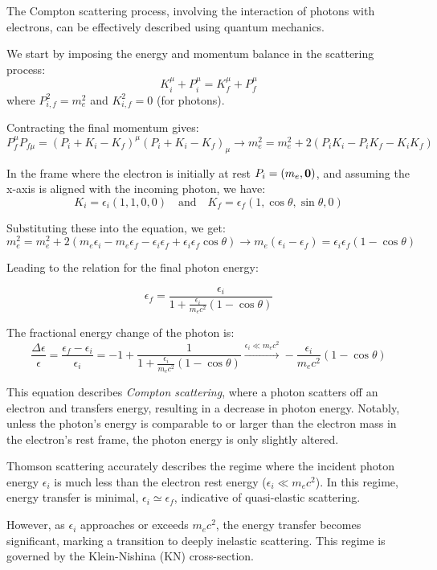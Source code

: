 The Compton scattering process, involving the interaction of photons with electrons, can be effectively described using quantum mechanics.

We start by imposing the energy and momentum balance in the scattering process:
%
\[
K_i^\mu + P_i^\mu = K_f^\mu + P_f^\mu
\]
%
where \( P_{i,f}^2 = m_e^2 \) and \( K_{i,f}^2 = 0 \) (for photons).

Contracting the final momentum gives:
%
\[
 P_f^\mu P_{f \mu} = (P_i + K_i - K_f)^\mu (P_i + K_i - K_f)_\mu  \rightarrow m_e^2 = m_e^2 + 2 (P_i K_i - P_i K_f - K_i K_f)
\]

In the frame where the electron is initially at rest \( P_i = \left( m_e, \vb 0 \right) \), and assuming the x-axis is aligned with the incoming photon, we have:
%
\[
K_i = \epsilon_i (1, 1, 0, 0) \quad \text{and} \quad K_f = \epsilon_f (1, \cos \theta, \sin \theta, 0)
\]

Substituting these into the equation, we get:
%
\[
m_e^2 = m_e^2 + 2 \left( m_e \epsilon_i - m_e \epsilon_f - \epsilon_i \epsilon_f + \epsilon_i \epsilon_f \cos \theta \right)
 \rightarrow m_e (\epsilon_i - \epsilon_f) = \epsilon_i \epsilon_f (1-\cos\theta)    
\]

Leading to the relation for the final photon energy:
%
\begin{remark}
\[
\epsilon_f = \frac{\epsilon_i}{1+ \frac{\epsilon_i}{m_e c^2} (1-\cos\theta)}
\]
\end{remark}

The fractional energy change of the photon is:
%
\[
\frac{\Delta \epsilon}{\epsilon}  
= \frac{\epsilon_f - \epsilon_i}{\epsilon_i} = -1 + \frac{1}{1 + \frac{\epsilon_i}{m_e c^2} (1-\cos\theta)} \overset{\epsilon_i \ll m_e c^2}{\longrightarrow} - \frac{\epsilon_i}{m_e c^2} (1-\cos\theta)
\]

This equation describes \emph{Compton scattering}, where a photon scatters off an electron and transfers energy, resulting in a decrease in photon energy. Notably, unless the photon's energy is comparable to or larger than the electron mass in the electron's rest frame, the photon energy is only slightly altered.

Thomson scattering accurately describes the regime where the incident photon energy \( \epsilon_i \) is much less than the electron rest energy (\( \epsilon_i \ll m_e c^2 \)). In this regime, energy transfer is minimal, \( \epsilon_i \simeq \epsilon_f \), indicative of quasi-elastic scattering.

However, as \( \epsilon_i \) approaches or exceeds \( m_e c^2 \), the energy transfer becomes significant, marking a transition to deeply inelastic scattering. This regime is governed by the Klein-Nishina (KN) cross-section.

